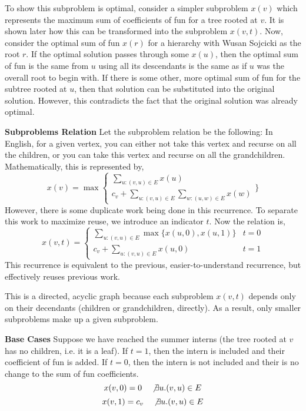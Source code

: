 \documentclass[12pt,twoside]{article}
\begin{document}
\begin{problems}
To show this subproblem is optimal, consider a simpler subproblem $x(v)$
which represents the maximum sum of coefficients of fun for a tree rooted at
$v$. It is shown later how this can be transformed into the subproblem $x(v,
t)$. Now, consider the optimal sum of fun $x(r)$ for a hierarchy with Wusan
Sojcicki as the root $r$. If the optimal solution passes through some $x(u)$,
then the optimal sum of fun is the same from $u$ using all its descendants is
the same as if $u$ was the overall root to begin with. If there is some
other, more optimal sum of fun for the subtree rooted at $u$, then that
solution can be substituted into the original solution. However, this
contradicts the fact that the original solution was already optimal.

{\bf Subproblems Relation} Let the subproblem relation be the following: In
English, for a given vertex, you can either not take this vertex and recurse
on all the children, or you can take this vertex and recurse on all the
grandchildren. Mathematically, this is represented by,
$$ x(v) = \max \begin{cases}
  \sum_{u : (v, u) \in E} x(u) \\
  c_v + \sum_{u : (v, u) \in E} \sum_{w : (u, w) \in E} x(w)
\end{cases} \Bigg\} $$
However, there is some duplicate work being done in this recurrence. To
separate this work to maximize reuse, we introduce an indicator $t$. Now the
relation is,
$$ x(v, t) = \begin{cases}
  \sum_{u : (v, u) \in E} \max \{ x(u, 0), x(u, 1) \} & t = 0 \\
  c_v + \sum_{u : (v, u) \in E} x(u, 0) & t = 1
\end{cases} $$
This recurrence is equivalent to the previous, easier-to-understand
recurrence, but effectively reuses previous work.

This is a directed, acyclic graph because each subproblem $x(v, t)$ depends
only on their decendants (children or grandchildren, directly). As a result,
only smaller subproblems make up a given subproblem.

{\bf Base Cases} Suppose we have reached the summer interns (the tree rooted
at $v$ has no children, i.e. it is a leaf). If $t = 1$, then the intern is
included and their coefficient of fun is added. If $t = 0$, then the intern
is not included and their is no change to the sum of fun coefficients.
$$ x(v, 0) = 0 \quad \not\exists u.(v, u) \in E $$
$$ x(v, 1) = c_v \quad \not\exists u.(v, u) \in E $$


\end{problems}
\end{document}
